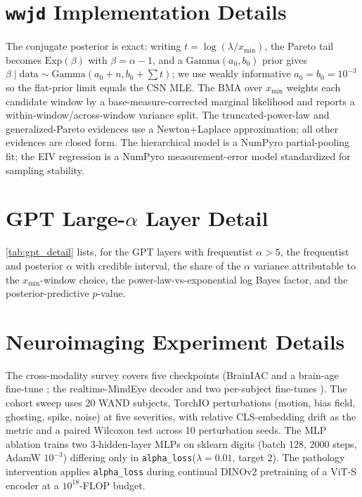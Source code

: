 \documentclass{article} %
\begin{document}
\section{\texttt{wwjd} Implementation Details}
\label{sec:appendix_impl}
The conjugate posterior is exact: writing $t = \log(\lambda / x_{\min})$, the Pareto tail
becomes $\text{Exp}(\beta)$ with $\beta = \alpha - 1$, and a $\text{Gamma}(a_0, b_0)$ prior
gives $\beta \mid \text{data} \sim \text{Gamma}(a_0 + n, b_0 + \sum t)$; we use weakly
informative $a_0 = b_0 = 10^{-3}$ so the flat-prior limit equals the CSN MLE. The BMA over
$x_{\min}$ weights each candidate window by a base-measure-corrected marginal likelihood and
reports a within-window/across-window variance split. The truncated-power-law and
generalized-Pareto evidences use a Newton+Laplace approximation; all other evidences are
closed form. The hierarchical model is a NumPyro partial-pooling fit; the EIV regression is
a NumPyro measurement-error model standardized for sampling stability.

\section{GPT Large-$\alpha$ Layer Detail}
\label{sec:appendix_gptdetail}
\cref{tab:gpt_detail} lists, for the GPT layers with frequentist $\alpha > 5$, the
frequentist and posterior $\alpha$ with credible interval, the share of the $\alpha$
variance attributable to the $x_{\min}$-window choice, the power-law-vs-exponential log
Bayes factor, and the posterior-predictive $p$-value.
\begin{table}[h]
\centering\small
\caption{GPT (openai-gpt) layers with frequentist $\alpha > 5$. Auto-generated.
$\alpha_{\rm f}$/$\alpha_{\rm b}$: frequentist/Bayesian exponent; win.var: $x_{\min}$-window
variance share; logBF$_{\rm exp}$: power-law vs exponential; ppc $p$: posterior-predictive.}
\label{tab:gpt_detail}
\wwGptDetailTable
\end{table}

\section{Neuroimaging Experiment Details}
\label{sec:appendix_neuro}
The cross-modality survey covers five checkpoints (BrainIAC and a brain-age fine-tune
\citep{brainiac2024}; the realtime-MindEye decoder and two per-subject fine-tunes
\citep{scotti2024realtime}). The cohort sweep uses 20 WAND subjects, TorchIO
\citep{perezgarcia2021torchio} perturbations (motion, bias field, ghosting, spike, noise) at
five severities, with relative CLS-embedding drift as the metric and a paired Wilcoxon test
across 10 perturbation seeds. The MLP ablation trains two 3-hidden-layer MLPs on sklearn
digits (batch 128, 2000 steps, AdamW $10^{-3}$) differing only in
\texttt{alpha\_loss}($\lambda = 0.01$, target 2). The pathology intervention applies
\texttt{alpha\_loss} during continual DINOv2 pretraining of a ViT-S encoder at a
$10^{18}$-FLOP budget.
\end{document}
